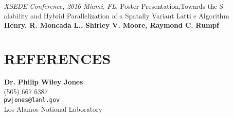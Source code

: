 \documentclass[margin]{res}
\begin{document}
\begin{resume}
{\sl XSEDE Conference, 2016  Miami, FL}.
Poster Presentation,Towards the S
alability and Hybrid Parallelization of a Spatally Variant Latti
e Algorithm
\textbf{Henry. R. Moncada L., Shirley V. Moore, Raymond C. Rumpf}

\newpage
\section{REFERENCES}
{\bf Dr. Philip Wiley Jones} \\
(505) 667 6387\\
\verb+pwjones@lanl.gov+\\
Los Alamos National Laboratory
% 

% 
% 


\end{resume}
\end{document}

